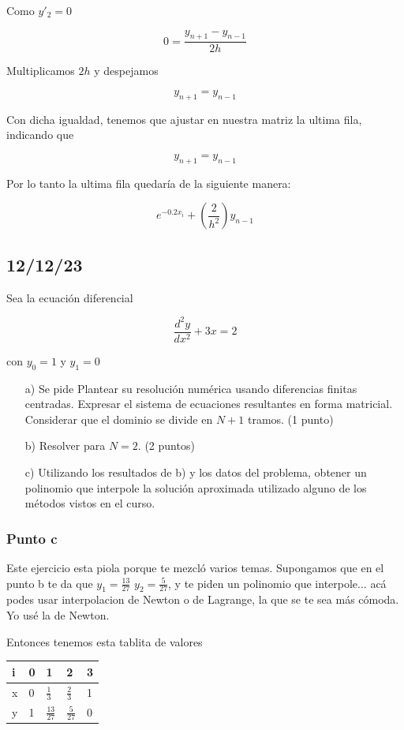 Como $y'_2 = 0$ 

$$
    0 = \frac{y_{n +1} - y_{n- 1}}{2h}
$$

Multiplicamos $2h$ y despejamos

$$
     y_{n +1} = y_{n- 1}
$$

Con dicha igualdad, tenemos que ajustar en nuestra matriz la ultima fila, indicando que

$$ y_{n +1} = y_{n- 1} $$

Por lo tanto la ultima fila quedaría de la siguiente manera: 

$$  e^{-0.2x_i}  +(\frac{2}{h^2})y_{n-1}$$

\subsection{12/12/23}

Sea la ecuación diferencial

$$\frac{d^2y}{dx^2} + 3x = 2$$

con $y_0 = 1$ y $y_1 = 0$

\begin{enumerate}
    \item[a)] Se pide Plantear su resolución numérica usando diferencias finitas centradas. Expresar el sistema de ecuaciones resultantes en forma matricial. Considerar que el dominio se divide en $N + 1$ tramos. (1 punto)
    \item[b)] Resolver para $N = 2$. (2 puntos)
    \item[c)] Utilizando los resultados de b) y los datos del problema, obtener un polinomio que interpole la solución aproximada utilizado alguno de los métodos vistos en el curso.
\end{enumerate}

\subsubsection{Punto c}

Este ejercicio esta piola porque te mezcló varios temas. Supongamos que en el punto b te da que $y_1 = \frac{13}{27} $ $ y_2 = \frac{5}{27} $, y te piden un polinomio que interpole... acá podes usar interpolacion de Newton o de Lagrange, la que se te sea más cómoda. Yo usé la de Newton.


Entonces tenemos esta tablita de valores 

\begin{center}
\begin{tabular}{ | m{1em} | m{1cm} | m{1cm} | m{1cm} | m{1cm} | } 
  \hline
  i & 0 & 1 & 2 & 3 \\ 
  \hline
  x & 0 & $\frac{1}{3}$ & $\frac{2}{3}$ & 1 \\ 
  \hline
  y & 1 & $\frac{13}{27}$ & $\frac{5}{27}$ & 0 \\ 
  \hline
\end{tabular}
\end{center}


